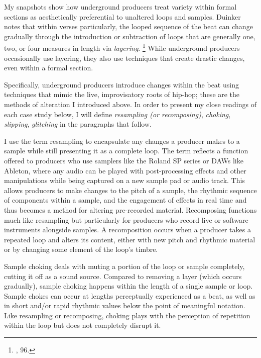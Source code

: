 My snapshots show how underground producers treat variety within formal sections as aesthetically
preferential to unaltered loops and samples. Duinker notes that within verses particularly, the 
looped sequence of the beat can change gradually through the introduction or subtraction of loops 
that are generally one, two, or four measures in length via \emph{layering}.
\footnote{\cite{benduinkerSongFormMainstreaming2020}, 96.} While underground producers occasionally
use layering, they also use techniques that create drastic changes, even within a formal section. 

Specifically, underground producers introduce changes within the beat using techniques that mimic
the live, improvisatory roots of hip-hop; these are the methods of alteration I introduced above. 
In order to present my close readings of each case study below, I will define \emph{resampling (or
recomposing)}, \emph{choking}, \emph{slipping}, \emph{glitching} in the paragraphs that follow.

I use the term resampling to encapsulate any changes a producer makes to a sample while still presenting
it as a complete loop. The term reflects a function offered to producers who use samplers like the Roland 
SP series or DAWs like Ableton, where any audio can be played with post-processing effects and other
manipulations while being captured on a new sample pad or audio track. This allows producers to make 
changes to the pitch of a sample, the rhythmic sequence of components within a sample, and the engagement
of effects in real time and thus becomes a method for altering pre-recorded material. Recomposing 
functions much like resampling but particularly for producers who record live or software instruments
alongside samples. A recomposition occurs when a producer takes a repeated loop and alters its content,
either with new pitch and rhythmic material or by changing some element of the loop's timbre. 

Sample choking deals with muting a portion of the loop or sample completely, cutting it off as a 
sound source. Compared to removing a layer (which occurs gradually), sample choking happens within 
the length of a single sample or loop. Sample chokes can occur at lengths perceptually experienced 
as a beat, as well as in short and/or rapid rhythmic values below the point of meaningful notation. 
Like resampling or recomposing, choking plays with the perception of repetition within the loop but 
does not completely disrupt it.

